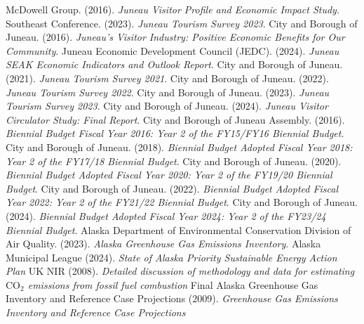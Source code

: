 
\begin{thebibliography}{99}
   McDowell Group. (2016). \textit{ Juneau Visitor Profile and Economic Impact Study}. 
   Southeast Conference. (2023).  \textit{Juneau Tourism Survey 2023}. 
   City and Borough of Juneau. (2016).  \textit{Juneau’s Visitor Industry: Positive Economic Benefits for Our Community}. 
   Juneau Economic Development Council (JEDC). (2024).  \textit{Juneau SEAK Economic Indicators and Outlook Report}. 
   City and Borough of Juneau. (2021).  \textit{Juneau Tourism Survey 2021}. 
   City and Borough of Juneau. (2022).  \textit{Juneau Tourism Survey 2022}. 
   City and Borough of Juneau. (2023).  \textit{Juneau Tourism Survey 2023}. 
   City and Borough of Juneau. (2024).  \textit{Juneau Visitor Circulator Study: Final Report}. 
   City and Borough of Juneau Assembly. (2016).  \textit{Biennial Budget Fiscal Year 2016: Year 2 of the FY15/FY16 Biennial Budget}. 
   City and Borough of Juneau. (2018).  \textit{Biennial Budget Adopted Fiscal Year 2018: Year 2 of the FY17/18 Biennial Budget}. 
   City and Borough of Juneau. (2020).  \textit{Biennial Budget Adopted Fiscal Year 2020: Year 2 of the FY19/20 Biennial Budget}. 
   City and Borough of Juneau. (2022).  \textit{Biennial Budget Adopted Fiscal Year 2022: Year 2 of the FY21/22 Biennial Budget}. 
   City and Borough of Juneau. (2024).  \textit{Biennial Budget Adopted Fiscal Year 2024: Year 2 of the FY23/24 Biennial Budget}. 
  Alaska Department of Environmental Conservation Division of Air Quality. (2023). \textit{Alaska Greenhouse Gas Emissions Inventory}.
  \bibitem{} Alaska Municipal League (2024). \textit{State of Alaska Priority Sustainable Energy Action Plan}
  \bibitem{} UK NIR (2008). \textit{Detailed discussion of methodology and data for estimating $\mathrm{CO}_2$ emissions from fossil fuel combustion}
  \bibitem{} Final Alaska Greenhouse Gas Inventory and Reference
  Case Projections (2009). \textit{Greenhouse Gas Emissions Inventory and Reference Case Projections}
\end{thebibliography}
